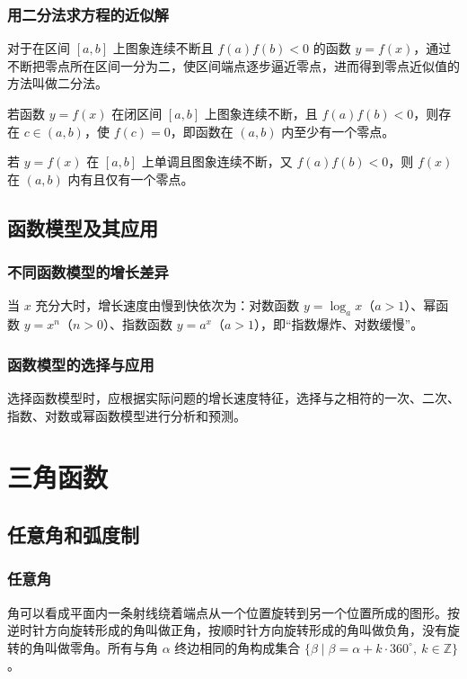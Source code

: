\documentclass[lang=cn,newtx,10pt,scheme=chinese,nofont]{elegantbook}
\begin{document}
\subsection{用二分法求方程的近似解}
\begin{definition}[二分法]
对于在区间 $[a,b]$ 上图象连续不断且 $f(a)f(b)<0$ 的函数 $y=f(x)$，通过不断把零点所在区间一分为二，使区间端点逐步逼近零点，进而得到零点近似值的方法叫做二分法。
\end{definition}
\begin{theorem}[函数零点存在定理]
若函数 $y=f(x)$ 在闭区间 $[a,b]$ 上图象连续不断，且 $f(a)f(b)<0$，则存在 $c \in (a,b)$，使 $f(c)=0$，即函数在 $(a,b)$ 内至少有一个零点。
\end{theorem}
\begin{corollary}[零点个数与单调性]
若 $y=f(x)$ 在 $[a,b]$ 上单调且图象连续不断，又 $f(a)f(b)<0$，则 $f(x)$ 在 $(a,b)$ 内有且仅有一个零点。
\end{corollary}

\section{函数模型及其应用}
\subsection{不同函数模型的增长差异}
\begin{definition}[不同函数模型的增长差异]
当 $x$ 充分大时，增长速度由慢到快依次为：对数函数 $y=\log_a x$（$a>1$）、幂函数 $y=x^n$（$n>0$）、指数函数 $y=a^x$（$a>1$），即“指数爆炸、对数缓慢”。
\end{definition}
\subsection{函数模型的选择与应用}
\begin{definition}[函数模型的选择]
选择函数模型时，应根据实际问题的增长速度特征，选择与之相符的一次、二次、指数、对数或幂函数模型进行分析和预测。
\end{definition}

\chapter{三角函数}

\section{任意角和弧度制}
\subsection{任意角}
\begin{definition}[任意角]
角可以看成平面内一条射线绕着端点从一个位置旋转到另一个位置所成的图形。按逆时针方向旋转形成的角叫做正角，按顺时针方向旋转形成的角叫做负角，没有旋转的角叫做零角。所有与角 $\alpha$ 终边相同的角构成集合 $\{\beta \mid \beta=\alpha+k\cdot 360^\circ,\ k \in \mathbb{Z}\}$。
\end{definition}
\end{document}

